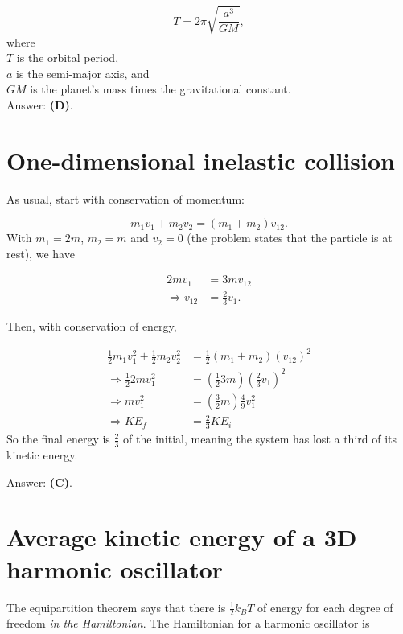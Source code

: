 \documentclass[11pt]{paper}
\newcommand{\answer}[1]{Answer: \textbf{(#1)}.}
\begin{document}
\begin{equation}
T = 2\pi \sqrt{\frac{a^3}{GM}},
\end{equation}
where\\
$T$ is the orbital period,\\
$a$ is the semi-major axis, and\\
$GM$ is the planet's mass times the gravitational constant.\\

\answer{D}

\section{One-dimensional inelastic collision}
As usual, start with conservation of momentum:

\begin{equation}
m_1 v_1 + m_2 v_2 = (m_1 + m_2) v_{12}.
\end{equation}
With $m_1 = 2m$, $m_2 = m$ and $v_2 = 0$ (the problem states that the particle is at rest), we have

\begin{align}
2m v_1 &= 3m v_{12}\\
\Rightarrow v_{12} &= \frac{2}{3} v_1.
\end{align}

Then, with conservation of energy,

\begin{align}
\frac{1}{2} m_1 v_1^2 + \frac{1}{2} m_2 v_2^2 &= \frac{1}{2} \left(m_1 + m_2\right) (v_{12})^2\\
\Rightarrow \frac{1}{2} 2 m v_1^2  &= \left(\frac{1}{2} 3 m\right) \left(\frac{2}{3} v_1\right)^2\\
\Rightarrow m v_1^2 &= \left(\frac{3}{2}m\right) \frac{4}{9} v_1^2\\
\Rightarrow KE_f &= \frac{2}{3} KE_i
\end{align}
So the final energy is $\frac{2}{3}$ of the initial, meaning the system has lost a third of its kinetic energy.

\answer{C}

\section{Average kinetic energy of a 3D harmonic oscillator}
The equipartition theorem says that there is $\frac{1}{2}k_B T$ of energy for each degree of freedom \emph{in the Hamiltonian}.  The Hamiltonian for a harmonic oscillator is 
\end{document}
